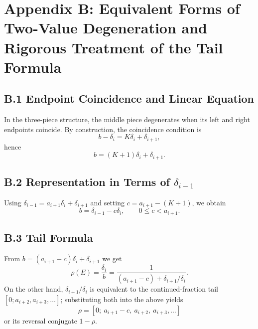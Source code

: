 \section{Appendix B: Equivalent Forms of Two-Value Degeneration and Rigorous Treatment of the Tail Formula}

\subsection*{B.1 Endpoint Coincidence and Linear Equation}

In the three-piece structure, the middle piece degenerates when its left and right endpoints coincide. By construction, the coincidence condition is
\[
b-\delta_i=K\delta_i+\delta_{i+1},
\]
hence
\[
b=(K+1)\delta_i+\delta_{i+1}.
\]

\subsection*{B.2 Representation in Terms of $\delta_{i-1}$}

Using $\delta_{i-1}=a_{i+1}\delta_i+\delta_{i+1}$ and setting $c=a_{i+1}-(K+1)$, we obtain
\[
b=\delta_{i-1}-c\delta_i,\qquad 0\le c<a_{i+1}.
\]

\subsection*{B.3 Tail Formula}

From $b=(a_{i+1}-c)\delta_i+\delta_{i+1}$ we get
\[
\rho(E)=\frac{\delta_i}{b}=\frac{1}{(a_{i+1}-c)+\delta_{i+1}/\delta_i}.
\]
On the other hand, $\delta_{i+1}/\delta_i$ is equivalent to the continued-fraction tail $[0;a_{i+2},a_{i+3},\dots]$; substituting both into the above yields
\[
\rho=[0;\ a_{i+1}-c,\ a_{i+2},\ a_{i+3},\dots]
\]
or its reversal conjugate $1-\rho$.
